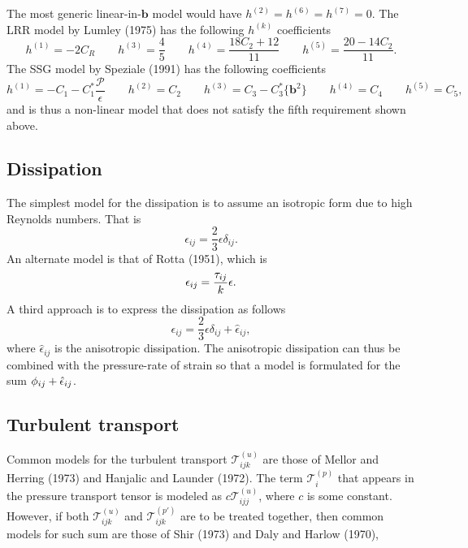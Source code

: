 \documentclass[oneside,a4paper,11pt]{report}
\begin{document}
The most generic linear-in-$\mathbf{b}$ model would have $h^{(2)} = h^{(6)} = h^{(7)} = 0$. The LRR model by Lumley (1975) has the following $h^{(k)}$ coefficients
\begin{equation}
h^{(1)} = -2C_R \qquad h^{(3)} = \frac{4}{5} \qquad h^{(4)} = \frac{18 C_2 + 12}{11} \qquad h^{(5)} = \frac{20 - 14 C_2}{11}.
\end{equation}
The SSG model by Speziale (1991) has the following coefficients
\begin{equation}
h^{(1)} =  -C_1 - C_1^*\frac{\mathcal{P}}{\epsilon} \qquad h^{(2)} = C_2 \qquad h^{(3)} = C_3 - C_3^* \{\mathbf{b}^2 \} \qquad h^{(4)} = C_4 \qquad h^{(5)} = C_5,
\end{equation}
and is thus a non-linear model that does not satisfy the fifth requirement shown above.

\subsection{Dissipation}

The simplest model for the dissipation is to assume an isotropic form due to high Reynolds numbers. That is
\begin{equation}
\epsilon_{ij} = \frac{2}{3} \epsilon \delta_{ij}.
\end{equation}
An alternate model is that of Rotta (1951), which is 
\begin{equation}
\epsilon_{ij} = \frac{\tau_{ij}}{k} \epsilon.
\end{equation}
A third approach is to express the dissipation as follows
\begin{equation}
\epsilon_{ij} = \frac{2}{3} \epsilon \delta_{ij} + \hat{\epsilon}_{ij},
\end{equation}
where $\hat{\epsilon}_{ij}$ is the anisotropic dissipation. The anisotropic dissipation can thus be combined with the pressure-rate of strain so that a model is formulated for the sum $\phi_{ij} + \hat{\epsilon}_{ij}$.

\subsection{Turbulent transport}
Common models for the turbulent transport $\mathcal{T}^{(u)}_{ijk}$ are those of Mellor and Herring (1973) and Hanjalic and Launder (1972). The term $\mathcal{T}^{(p)}_i$ that appears in the pressure transport tensor is modeled as $c\mathcal{T}^{(u)}_{ijj}$, where $c$ is some constant. However, if both $\mathcal{T}^{(u)}_{ijk}$ and $\mathcal{T}^{(p')}_{ijk}$ are to be treated together, then common models for such sum are those of Shir (1973) and Daly and Harlow (1970),
\end{document}
